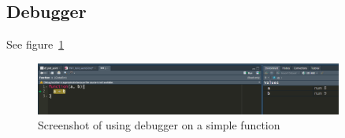 \subsection{Debugger}
See figure~\ref{fig:debugger}
\begin{figure}[h]
    \centering
    \includegraphics[width=0.9\textwidth]{image/debugger.png}
    \caption{Screenshot of using debugger on a simple function}
    \label{fig:debugger}
\end{figure}